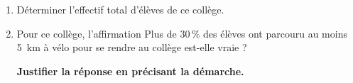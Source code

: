 \begin{enumerate}
	\begin{enumerate}
	\item Déterminer l'effectif total d'élèves de ce collège.
	\item Pour ce collège, l'affirmation \og Plus de 30\,\% des élèves ont parcouru au moins 5~km à vélo
pour se rendre au collège \fg est-elle vraie ?

\textbf{Justifier la réponse en précisant la démarche.}
	\end{enumerate}
\end{enumerate}

\bigskip

